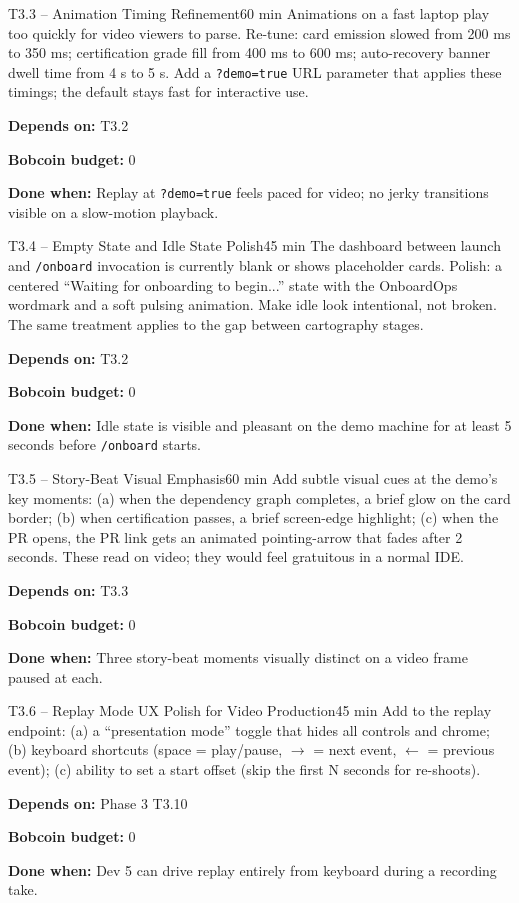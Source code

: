 \documentclass[11pt,letterpaper]{article}
\newcommand{\acceptance}[1]{\par\smallskip\textcolor{ibmgreen}{\textbf{Done when:}} #1}
\newcommand{\depends}[1]{\par\smallskip\textcolor{ibmorange}{\textbf{Depends on:}} #1}
\newcommand{\bobcost}[1]{\par\smallskip\textcolor{ibmaccent}{\textbf{Bobcoin budget:}} #1}
\begin{document}
\begin{task}{T3.3 -- Animation Timing Refinement}{60 min}
Animations on a fast laptop play too quickly for video viewers to parse. Re-tune: card emission slowed from 200 ms to 350 ms; certification grade fill from 400 ms to 600 ms; auto-recovery banner dwell time from 4 s to 5 s. Add a \texttt{?demo=true} URL parameter that applies these timings; the default stays fast for interactive use.
\depends{T3.2}
\bobcost{0}
\acceptance{Replay at \texttt{?demo=true} feels paced for video; no jerky transitions visible on a slow-motion playback.}
\end{task}

\begin{task}{T3.4 -- Empty State and Idle State Polish}{45 min}
The dashboard between launch and \texttt{/onboard} invocation is currently blank or shows placeholder cards. Polish: a centered ``Waiting for onboarding to begin...'' state with the OnboardOps wordmark and a soft pulsing animation. Make idle look intentional, not broken. The same treatment applies to the gap between cartography stages.
\depends{T3.2}
\bobcost{0}
\acceptance{Idle state is visible and pleasant on the demo machine for at least 5 seconds before \texttt{/onboard} starts.}
\end{task}

\begin{task}{T3.5 -- Story-Beat Visual Emphasis}{60 min}
Add subtle visual cues at the demo's key moments: (a) when the dependency graph completes, a brief glow on the card border; (b) when certification passes, a brief screen-edge highlight; (c) when the PR opens, the PR link gets an animated pointing-arrow that fades after 2 seconds. These read on video; they would feel gratuitous in a normal IDE.
\depends{T3.3}
\bobcost{0}
\acceptance{Three story-beat moments visually distinct on a video frame paused at each.}
\end{task}

\begin{task}{T3.6 -- Replay Mode UX Polish for Video Production}{45 min}
Add to the replay endpoint: (a) a ``presentation mode'' toggle that hides all controls and chrome; (b) keyboard shortcuts (space = play/pause, $\rightarrow$ = next event, $\leftarrow$ = previous event); (c) ability to set a start offset (skip the first N seconds for re-shoots).
\depends{Phase 3 T3.10}
\bobcost{0}
\acceptance{Dev 5 can drive replay entirely from keyboard during a recording take.}
\end{task}
\end{document}
